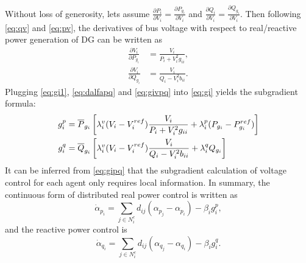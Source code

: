 \documentclass{article}
\begin{document}
Without loss of generosity, lets assume $\frac{\partial P_{i}}{\partial V_i}=\frac{\partial P_{g_i}}{\partial V_i}$ and $\frac{\partial Q_{i}}{\partial V_i}=\frac{\partial Q_{g_i}}{\partial V_i}$. Then following \eqref{eq:qv} and \eqref{eq:pv}, the derivatives of bus voltage with respect to real/reactive power generation of DG can be written as
\begin{subequations}
\begin{align}
\frac{\partial V_i}{\partial P_{g_i}} &= \frac{V_i}{P_i+V_i^2 g_{ii}},
    \label{eq:givp}\\
    \frac{\partial V_i}{\partial Q_{g_i}}  &= \frac{V_i}{Q_i-V_i^2 b_{ii}}.
    \label{eq:givq}
\end{align}\label{eq:givpq}
\end{subequations}
Plugging \eqref{eq:gi1}, \eqref{eq:dalfapq} and \eqref{eq:givpq} into \eqref{eq:gi} yields the subgradient formula: 
\begin{subequations}
\begin{align}
  g^p_i&=\overline P_{g_i}\left[\lambda^v_i(V_i-V_i^{ref}) \frac{V_i}{P_i+V_i^2 g_{ii}}+\lambda^p_i(P_{g_i}-P^{ref}_{g_i})\right]
\\
g^q_i&=\overline Q_{g_i}\left[\lambda^v_i(V_i-V_i^{ref}) \frac{V_i}{Q_i-V_i^2 b_{ii}}+\lambda^q_iQ_{g_i}\right]
\end{align}\label{eq:gipq}\noindent
\end{subequations}
It can be inferred from \eqref{eq:gipq} that the subgradient calculation of voltage control for each agent only requires local information. In summary, the continuous form of distributed real power control is written as
\begin{equation}
    \dot \alpha_{p_i} = \sum_{j \in N_i^c}d_{ij} (\alpha_{p_j}-\alpha_{p_i}) - \beta_i g^p_{i},  \label{eq:dalfap}
\end{equation}
and the reactive power control is \begin{equation}
    \dot \alpha_{q_i} = \sum_{j \in N_i^c}d_{ij} (\alpha_{q_j}-\alpha_{q_i}) - \beta_i g^q_{i}. \label{eq:dalfaq}
\end{equation}
\end{document}

